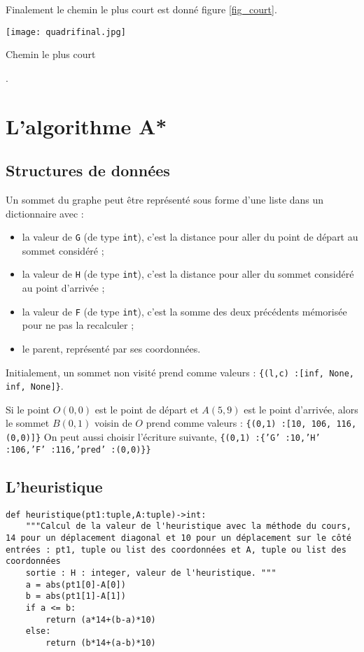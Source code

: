 Finalement le chemin le plus court est donné figure \ref{fig_court}.

\begin{marginfigure}
\texttt{[image: quadrifinal.jpg]}
\caption{Chemin le plus court \label{fig_court}}.
\end{marginfigure}



\section{L'algorithme A*}
\subsection{Structures de données}


Un sommet du graphe peut être représenté sous forme d’une liste dans un dictionnaire avec :
\begin{itemize}
\item  la valeur de \texttt{G} (de type \texttt{int}), c’est la distance pour aller du point de départ au sommet considéré ;
\item la valeur de \texttt{H} (de type \texttt{int}), c’est la distance pour aller du sommet considéré au point d’arrivée ;
\item la valeur de \texttt{F} (de type \texttt{int}), c’est la somme des deux précédents mémorisée pour ne pas la recalculer ;
\item le parent, représenté par ses coordonnées.
\end{itemize}

Initialement, un sommet non visité prend comme valeurs : \texttt{\{(l,c) :[inf, None, inf, None]\}}.

Si le point $O(0,0)$ est le point de départ et $A(5,9)$ est le point d’arrivée, alors le sommet $B(0,1)$ voisin
de $O$ prend comme valeurs :
\texttt{\{(0,1) :[10, 106, 116, (0,0)]\}}
On peut aussi choisir l’écriture suivante,
\texttt{\{(0,1) :\{'G' :10,'H' :106,'F' :116,'pred' :(0,0)\}\}}

\subsection{L'heuristique}
\begin{lstlisting}
def heuristique(pt1:tuple,A:tuple)->int:
    """Calcul de la valeur de l'heuristique avec la méthode du cours, 14 pour un déplacement diagonal et 10 pour un déplacement sur le côté entrées : pt1, tuple ou list des coordonnées et A, tuple ou list des coordonnées 
    sortie : H : integer, valeur de l'heuristique. """
    a = abs(pt1[0]-A[0])
    b = abs(pt1[1]-A[1])
    if a <= b:
        return (a*14+(b-a)*10)
    else:
        return (b*14+(a-b)*10)
\end{lstlisting}

